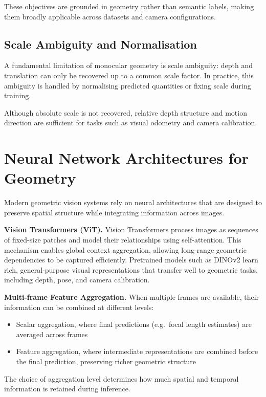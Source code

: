 These objectives are grounded in geometry rather than semantic labels, making them broadly applicable across datasets and camera configurations.

\subsection{Scale Ambiguity and Normalisation}
A fundamental limitation of monocular geometry is scale ambiguity: depth and translation can only be recovered up to a common scale factor. In practice, this ambiguity is handled by normalising predicted quantities or fixing scale during training.

Although absolute scale is not recovered, relative depth structure and motion direction are sufficient for tasks such as visual odometry and camera calibration.

\section{Neural Network Architectures for Geometry}\label{sec:neural-architectures-geometry}
Modern geometric vision systems rely on neural architectures that are designed to preserve spatial structure while integrating information across images.

\textbf{Vision Transformers (ViT).}
Vision Transformers process images as sequences of fixed-size patches and model their relationships using self-attention. This mechanism enables global context aggregation, allowing long-range geometric dependencies to be captured efficiently. Pretrained models such as DINOv2 learn rich, general-purpose visual representations that transfer well to geometric tasks, including depth, pose, and camera calibration.

\textbf{Multi-frame Feature Aggregation.}
When multiple frames are available, their information can be combined at different levels:

\begin{itemize}
    \item Scalar aggregation, where final predictions (e.g.\ focal length estimates) are averaged across frames
    \item Feature aggregation, where intermediate representations are combined before the final prediction, preserving richer geometric structure
\end{itemize}

The choice of aggregation level determines how much spatial and temporal information is retained during inference.

